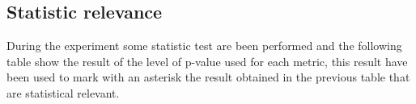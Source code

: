 \documentclass[11pt]{article}
\begin{document}
\vspace{10pt}
\begin{table}[H]
\centering
{}
\caption{Comparison between algorithms (Part 6)}
\end{table}



\subsection{Statistic relevance}\label{subsec:stas_rel}
During the experiment some statistic test are been performed and the following table show the result
of the level of p-value used for each metric, this result have been used to mark with an asterisk
the result obtained in the previous table that are statistical relevant.
\end{document}
